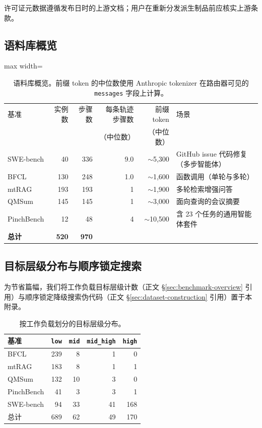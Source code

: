 许可证元数据遵循发布日时的上游文档；用户在重新分发派生制品前应核实上游条款。

\subsection{语料库概览}
\label{app:corpus-overview}

\begin{table}[ht]
\centering
\small
\begin{adjustbox}{max width=\linewidth}
\begin{tabular}{lrrrrl}
\toprule
基准 & 实例数 & 步骤数 & 每条轨迹步骤数 & 前缀 token & 场景 \\
 & & & （中位数） & （中位数） & \\
\midrule
SWE-bench      & 40  & 336 & 9.0 & $\sim$5{,}300 & GitHub issue 代码修复（多步智能体） \\
BFCL           & 130 & 248 & 1.0 & $\sim$1{,}600 & 函数调用（单轮与多轮） \\
mtRAG          & 193 & 193 & 1   & $\sim$1{,}900 & 多轮检索增强问答 \\
QMSum          & 145 & 145 & 1   & $\sim$3{,}000 & 面向查询的会议摘要 \\
PinchBench     & 12  & 48  & 4   & $\sim$10{,}500 & 含 23 个任务的通用智能体套件 \\
\midrule
\textbf{总计} & \textbf{520} & \textbf{970} & & & \\
\bottomrule
\end{tabular}
\end{adjustbox}
\caption{语料库概览。前缀 token 的中位数使用 Anthropic tokenizer 在路由器可见的 \texttt{messages} 字段上计算。}
\label{tab:corpus-overview}
\end{table}

\subsection{目标层级分布与顺序锁定搜索}
\label{app:tier-alg}

为节省篇幅，我们将工作负载目标层级计数（正文 \S\ref{sec:benchmark-overview} 引用）与顺序锁定降级搜索伪代码（正文 \S\ref{sec:dataset-construction} 引用）置于本附录。

\begin{table}[ht]
\centering
\small
\begin{tabular}{lrrrr}
\toprule
基准 & \texttt{low} & \texttt{mid} & \texttt{mid\_high} & \texttt{high} \\
\midrule
BFCL       & 239 & 8  & 1  & 0 \\
mtRAG      & 183 & 8  & 1  & 1 \\
QMSum      & 132 & 10 & 3  & 0 \\
PinchBench & 41  & 3  & 3  & 1 \\
SWE-bench  & 94  & 33 & 41 & 168 \\
\midrule
总计      & 689 & 62 & 49 & 170 \\
\bottomrule
\end{tabular}
\caption{按工作负载划分的目标层级分布。}
\label{tab:tier-distribution}
\end{table}

